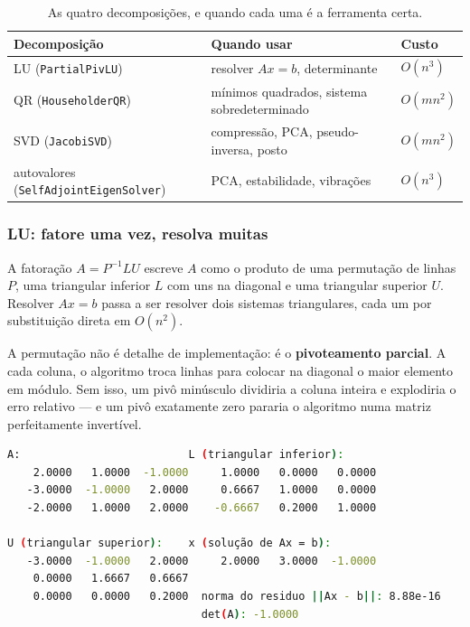 \begin{table}[htbp]
\centering
\caption{As quatro decomposições, e quando cada uma é a ferramenta certa.}
\label{tab:decomposicoes}
\footnotesize
\begin{tabular}{@{}lll@{}}
\toprule
\textbf{Decomposição} & \textbf{Quando usar} & \textbf{Custo} \\
\midrule
LU (\texttt{PartialPivLU})            & resolver $Ax=b$, determinante        & $O(n^3)$ \\
QR (\texttt{HouseholderQR})           & mínimos quadrados, sistema sobredeterminado & $O(mn^2)$ \\
SVD (\texttt{JacobiSVD})              & compressão, PCA, pseudo-inversa, posto & $O(mn^2)$ \\
autovalores (\texttt{SelfAdjointEigenSolver}) & PCA, estabilidade, vibrações & $O(n^3)$ \\
\bottomrule
\end{tabular}
\end{table}

\subsubsection{LU: fatore uma vez, resolva muitas}

A fatoração $A = P^{-1}LU$ escreve $A$ como o produto de uma permutação de
linhas $P$, uma triangular inferior $L$ com uns na diagonal e uma triangular
superior $U$. Resolver $Ax = b$ passa a ser resolver dois sistemas triangulares,
cada um por substituição direta em $O(n^2)$.

A permutação não é detalhe de implementação: é o \textbf{pivoteamento parcial}.
A cada coluna, o algoritmo troca linhas para colocar na diagonal o maior
elemento em módulo. Sem isso, um pivô minúsculo dividiria a coluna inteira e
explodiria o erro relativo --- e um pivô exatamente zero pararia o algoritmo numa
matriz perfeitamente invertível.

\begin{lstlisting}[style=bt, language=bash,
    caption={Saída real de \texttt{./dist/bin/eigen\_demo}, demo 1 (trechos).}]
A:                          L (triangular inferior):
    2.0000   1.0000  -1.0000     1.0000   0.0000   0.0000
   -3.0000  -1.0000   2.0000     0.6667   1.0000   0.0000
   -2.0000   1.0000   2.0000    -0.6667   0.2000   1.0000

U (triangular superior):    x (solução de Ax = b):
   -3.0000  -1.0000   2.0000     2.0000   3.0000  -1.0000
    0.0000   1.6667   0.6667
    0.0000   0.0000   0.2000  norma do residuo ||Ax - b||: 8.88e-16
                              det(A): -1.0000
\end{lstlisting}

